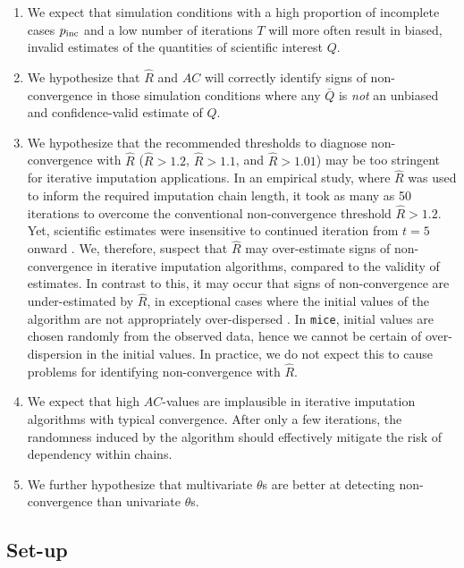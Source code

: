 \documentclass[Royal,times,sageh]{sagej}
\begin{document}
\begin{enumerate}
\def\labelenumi{\arabic{enumi}.}
\item
  We expect that simulation conditions with a high proportion of incomplete cases \(p_{\rm inc}\) and a low number of iterations \(T\) will more often result in biased, invalid estimates of the quantities of scientific interest \(Q\).
\item
  We hypothesize that \(\widehat{R}\) and \(AC\) will correctly identify signs of non-convergence in those simulation conditions where any \(\bar{Q}\) is \emph{not} an unbiased and confidence-valid estimate of \(Q\).
\item
  We hypothesize that the recommended thresholds to diagnose non-convergence with \(\widehat{R}\) (\(\widehat{R} > 1.2\), \(\widehat{R} > 1.1\), and \(\widehat{R} > 1.01\)) may be too stringent for iterative imputation applications. In an empirical study, where \(\widehat{R}\) was used to inform the required imputation chain length, it took as many as 50 iterations to overcome the conventional non-convergence threshold \(\widehat{R}>1.2\). Yet, scientific estimates were insensitive to continued iteration from \(t=5\) onward \citep{lace07}. We, therefore, suspect that \(\widehat{R}\) may over-estimate signs of non-convergence in iterative imputation algorithms, compared to the validity of estimates. In contrast to this, it may occur that signs of non-convergence are under-estimated by \(\widehat{R}\), in exceptional cases where the initial values of the algorithm are not appropriately over-dispersed \citep[p.~437]{broo98}. In \texttt{mice}, initial values are chosen randomly from the observed data, hence we cannot be certain of over-dispersion in the initial values. In practice, we do not expect this to cause problems for identifying non-convergence with \(\widehat{R}\).
\item
  We expect that high \(AC\)-values are implausible in iterative imputation algorithms with typical convergence. After only a few iterations, the randomness induced by the algorithm should effectively mitigate the risk of dependency within chains.
\item
  We further hypothesize that multivariate \(\theta\)s are better at detecting non-convergence than univariate \(\theta\)s.
\end{enumerate}

\hypertarget{set-up}{%
\subsection{Set-up}\label{set-up}}
\end{document}
